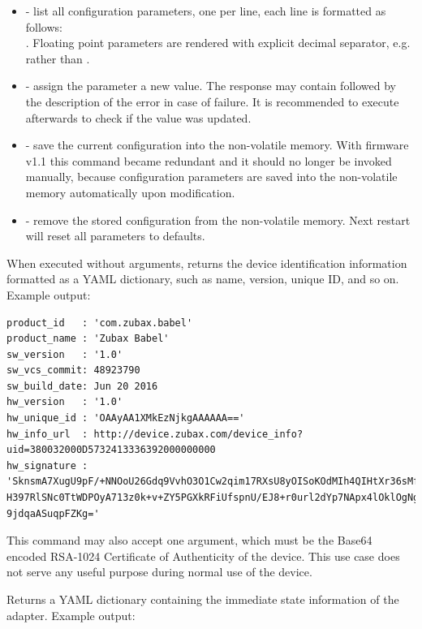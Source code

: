 \documentclass{zubaxdoc}
\begin{document}
\begin{itemize}
\item {} - list all configuration parameters, one per line, each line is formatted as follows:\\ . Floating point parameters are rendered with explicit decimal separator, e.g.   rather than .
\item {} - assign the parameter a new value. The response may contain  followed by the description of the error in case of failure. It is recommended to execute  afterwards to check if the value was updated.
\item {} - save the current configuration into the non-volatile memory. With firmware v1.1 this command became redundant and it should no longer be invoked manually,  because configuration parameters are saved into the non-volatile memory automatically upon modification.
\item {} - remove the stored configuration from the non-volatile memory. Next restart will reset all parameters to defaults.
\end{itemize}


When executed without arguments, returns the device identification information formatted as a YAML dictionary, such as name, version, unique ID, and so on. Example output:

\begin{verbatim}
product_id   : 'com.zubax.babel'
product_name : 'Zubax Babel'
sw_version   : '1.0'
sw_vcs_commit: 48923790
sw_build_date: Jun 20 2016
hw_version   : '1.0'
hw_unique_id : 'OAAyAA1XMkEzNjkgAAAAAA=='
hw_info_url  : http://device.zubax.com/device_info?uid=380032000D5732413336392000000000
hw_signature : 'SknsmA7XugU9pF/+NNOoU26Gdq9VvhO3O1Cw2qim17RXsU8yOISoKOdMIh4QIHtXr36sMfx
H397RlSNc0TtWDPOyA713z0k+v+ZY5PGXkRFiUfspnU/EJ8+r0url2dYp7NApx4lOklOgNgHrGCA6lPxA8UqoW
9jdqaASuqpFZKg='
\end{verbatim}

This command may also accept one argument, which must be the Base64 encoded RSA-1024 Certificate of Authenticity of the device. This use case does not serve any useful purpose during normal use of the device.

\clearpage


Returns a YAML dictionary containing the immediate state information of the adapter. Example output:
\end{document}
